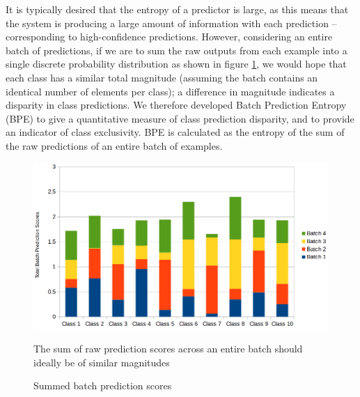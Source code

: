 \documentclass{report}
\begin{document}
It is typically desired that the entropy of a predictor is large, as this means that the system is producing a large amount of information with each prediction -- corresponding to high-confidence predictions. However, considering an entire batch of predictions, if we are to sum the raw outputs from each example into a single discrete probability distribution as shown in figure \ref{fig:totalbatchpredscores:1}, we would hope that each class has a similar total magnitude (assuming the batch contains an identical number of elements per class); a difference in magnitude indicates a disparity in class predictions. We therefore developed Batch Prediction Entropy (BPE) to give a quantitative measure of class prediction disparity, and to provide an indicator of class exclusivity. BPE is calculated as the entropy of the sum of the raw predictions of an entire batch of examples. \par
\begin{figure}[h!]
	\centering
	\includegraphics[width=13cm]{totalbatchpredscores}
	\caption{Summed batch prediction scores}
	The sum of raw prediction scores across an entire batch should ideally be of similar magnitudes
	\label{fig:totalbatchpredscores:1}
\end{figure}
\end{document}
